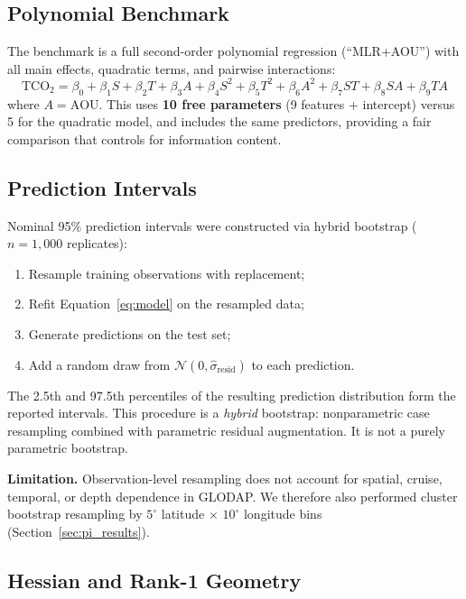 \documentclass[12pt,a4paper]{article}
\begin{document}
\subsection{Polynomial Benchmark}

The benchmark is a full second-order polynomial regression (``MLR+AOU'') with all main effects, quadratic terms, and pairwise interactions:
\begin{equation}
\text{TCO}_2 = \beta_0 + \beta_1 S + \beta_2 T + \beta_3 A + \beta_4 S^2 + \beta_5 T^2 + \beta_6 A^2 + \beta_7 ST + \beta_8 SA + \beta_9 TA
\label{eq:mlr}
\end{equation}
where $A = \text{AOU}$. This uses \textbf{10 free parameters} (9 features + intercept) versus 5 for the quadratic model, and includes the same predictors, providing a fair comparison that controls for information content.

\subsection{Prediction Intervals}

Nominal 95\% prediction intervals were constructed via hybrid bootstrap ($n = 1{,}000$ replicates):
\begin{enumerate}[nosep]
    \item Resample training observations with replacement;
    \item Refit Equation~\eqref{eq:model} on the resampled data;
    \item Generate predictions on the test set;
    \item Add a random draw from $\mathcal{N}(0, \hat{\sigma}_{\text{resid}})$ to each prediction.
\end{enumerate}
The 2.5th and 97.5th percentiles of the resulting prediction distribution form the reported intervals. This procedure is a \emph{hybrid} bootstrap: nonparametric case resampling combined with parametric residual augmentation. It is not a purely parametric bootstrap.

\textbf{Limitation.} Observation-level resampling does not account for spatial, cruise, temporal, or depth dependence in GLODAP. We therefore also performed cluster bootstrap resampling by $5^\circ$ latitude $\times$ $10^\circ$ longitude bins (Section~\ref{sec:pi_results}).

\subsection{Hessian and Rank-1 Geometry}
\end{document}
